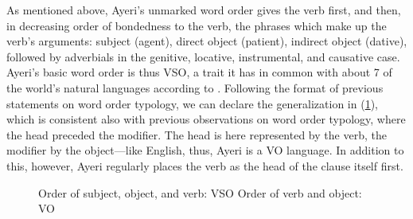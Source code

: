 As mentioned above, Ayeri's unmarked word order gives the verb first, and then,
in decreasing order of bondedness to the verb, the phrases which make up the
verb's arguments: subject (agent), direct object (patient), indirect object
(dative), followed by adverbials in the genitive, locative, instrumental, and
causative case. Ayeri's basic word order is thus VSO, a trait it has in common
with about 7\pct{} of the world's natural languages according to
\citet{wals81}.
Following the format of previous statements on word order typology, we can
declare the generalization in (\ref{ex:constordertypo}), which is consistent
also with previous observations on word order typology, where the head preceded
the modifier. The head is here represented by the verb, the modifier by the
object---like English, thus, Ayeri is a VO language. In addition to this,
however, Ayeri regularly places the verb as the head of the clause itself first.

\begin{figure}[h]
\pex\label{ex:constordertypo}%
\a Order of subject, object, and verb: VSO
\a Order of verb and object: VO
\xe
\end{figure}



